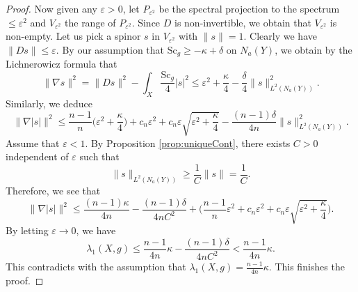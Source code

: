 \documentclass[12pt, reqno]{amsart}
\theoremstyle{plain}%
\theoremstyle{definition}
\theoremstyle{remark}
\numberwithin{equation}{section}
\newcommand{\Sc}{\mathrm{Sc}}
\begin{document}
\begin{proof}
	Now given any $\varepsilon>0$, let $P_{\varepsilon^2}$ be the spectral projection to the spectrum $\leq\varepsilon^2$ and $V_{\varepsilon^2}$ the range of $P_{\varepsilon^2}$. Since $D$ is non-invertible,  we obtain that $V_{\varepsilon^2}$ is non-empty. Let us pick a spinor $s$ in $V_{\varepsilon^2}$ with $\|s\|=1$. Clearly we have $\|Ds\|\leq\varepsilon.$  By our assumption that  $\Sc_{g}\geq -\kappa+\delta$ on $N_a(Y)$, we obtain by the Lichnerowicz formula that
	$$\|\nabla s\|^2=\|D s\|^2-\int_X\frac{\Sc_g}{4}|s|^2\leq \varepsilon^2+\frac{\kappa}{4}-\frac{\delta}{4}\|s\|^2_{L^2(N_a(Y))}.$$
	Similarly, we deduce
	$$\Big\|\nabla|s|\Big\|^2
	\leq \frac{n-1}{n}\big(\varepsilon^2+\frac{\kappa}{4}\big)+c_n\varepsilon^2+c_n\varepsilon\sqrt{\varepsilon^2+\frac{\kappa}{4}}-\frac{(n-1)\delta}{4n}\|s\|^2_{L^2(N_a(Y))}.$$
	Assume that $\varepsilon<1$. By Proposition \ref{prop:uniqueCont}, there exists $C>0$ independent of $\varepsilon$ such that
	$$\|s\|_{L^2(N_a(Y))}\geq \frac 1 C\|s\|=\frac 1 C.$$
	Therefore, we see that
	$$\Big\|\nabla|s|\Big\|^2
	\leq\frac{(n-1)\kappa}{4n}-\frac{(n-1)\delta}{4nC^2}+\Big(	
	\frac{n-1}{n}\varepsilon^2+c_n\varepsilon^2+c_n\varepsilon\sqrt{\varepsilon^2+\frac{\kappa}{4}}\Big).$$
	By letting $\varepsilon\to 0$, we have
	$$\lambda_1(X,g)\leq  \frac{n-1}{4n}\kappa-\frac{(n-1)\delta}{4nC^2}<\frac{n-1}{4n}\kappa.$$
	This contradicts with the assumption that $\lambda_1(X,g)=\frac{n-1}{4n}\kappa$. This finishes the proof.
\end{proof}


\end{document}
